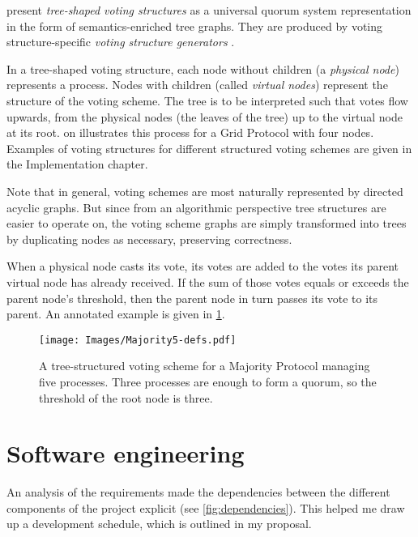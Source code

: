 \documentclass[12pt,chapterprefix=true,toc=bibliography,numbers=noendperiod,
               footnotes=multiple,twoside]{scrreprt}
\begin{document}

\citeauthor{generators} present \emph{tree-shaped voting structures} as a universal quorum system representation in the form of semantics-enriched tree graphs. They are produced by voting structure-specific \emph{voting structure generators} \autocite{generators}.

In a tree-shaped voting structure, each node without children (a \emph{physical node}) represents a process. Nodes with children (called \emph{virtual nodes}) represent the structure of the voting scheme. The tree is to be interpreted such that votes flow upwards, from the physical nodes (the leaves of the tree) up to the virtual node at its root.  on  illustrates this process for a Grid Protocol with four nodes. Examples of voting structures for different structured voting schemes are given in the Implementation chapter.

Note that in general, voting schemes are most naturally represented by directed acyclic graphs. But since from an algorithmic perspective tree structures are easier to operate on, the voting scheme graphs are simply transformed into trees by duplicating nodes as necessary, preserving correctness.

When a physical node casts its vote, its votes are added to the votes its parent virtual node has already received. If the sum of those votes equals or exceeds the parent node's threshold, then the parent node in turn passes its vote to its parent. An annotated example is given in \cref{fig:majority5-defs}.

\begin{figure}[h]
    \centering
    \texttt{[image: Images/Majority5-defs.pdf]}
    \caption[Tree-structured voting scheme for a Majority Protocol]{A tree-structured voting scheme for a Majority Protocol managing five processes. Three processes are enough to form a quorum, so the threshold of the root node is three.}
    \label{fig:majority5-defs}
\end{figure}

\section{Software engineering}
\label{sc:software-engineering}

An analysis of the requirements made the dependencies between the different components of the project explicit (see \cref{fig:dependencies}). This helped me draw up a development schedule, which is outlined in my proposal.
\end{document}
